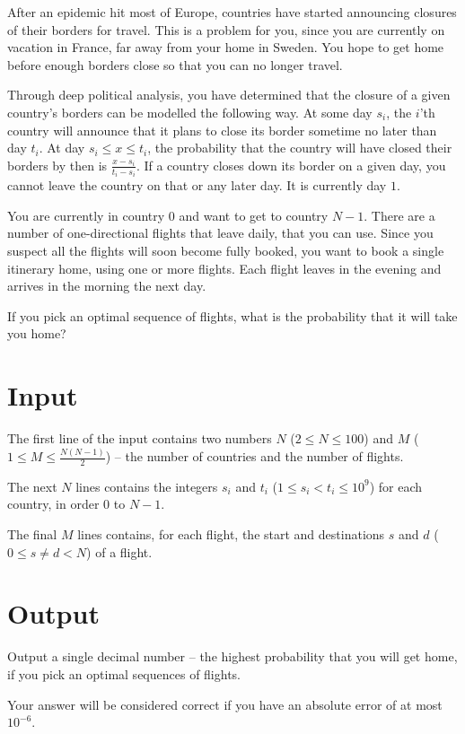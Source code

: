 After an epidemic hit most of Europe, countries have started announcing closures of their borders for travel.
This is a problem for you, since you are currently on vacation in France, far away from your home in Sweden.
You hope to get home before enough borders close so that you can no longer travel.

Through deep political analysis, you have determined that the closure of a given country's borders can be modelled the following way.
At some day $s_i$, the $i$'th country will announce that it plans to close its border sometime no later than day $t_i$.
At day $s_i \le x \le t_i$, the probability that the country will have closed their borders by then is $\frac{x - s_i}{t_i - s_i}$.
If a country closes down its border on a given day, you cannot leave the country on that or any later day.
It is currently day $1$.

You are currently in country $0$ and want to get to country $N - 1$.
There are a number of one-directional flights that leave daily, that you can use.
Since you suspect all the flights will soon become fully booked, you want to book a single itinerary home, using one or more flights.
Each flight leaves in the evening and arrives in the morning the next day.

If you pick an optimal sequence of flights, what is the probability that it will take you home?

\section*{Input}
The first line of the input contains two numbers $N$ ($2 \le N \le 100$) and $M$ ($1 \le M \le \frac{N(N-1)}{2}$)  -- the number of countries and the number of flights.

The next $N$ lines contains the integers $s_i$ and $t_i$ ($1 \le s_i < t_i \le 10^9$) for each country, in order $0$ to $N - 1$.

The final $M$ lines contains, for each flight, the start and destinations $s$ and $d$ ($0 \le s \neq d < N$) of a flight.

\section{Output}
Output a single decimal number -- the highest probability that you will get home, if you pick an optimal sequences of flights.

Your answer will be considered correct if you have an absolute error of at most ${10}^{-6}$.
